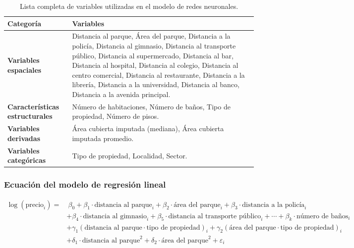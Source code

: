 \documentclass[a4paper]{article}
\theoremstyle{remark}
\theoremstyle{definition}
\begin{document}
\begin{table}[h!]
\centering
\begin{tabular}{l|p{12cm}}
\hline
\textbf{Categoría} & \textbf{Variables} \\ \hline
\textbf{Variables espaciales} & Distancia al parque, Área del parque, Distancia a la policía, Distancia al gimnasio, Distancia al transporte público, Distancia al supermercado, Distancia al bar, Distancia al hospital, Distancia al colegio, Distancia al centro comercial, Distancia al restaurante, Distancia a la librería, Distancia a la universidad, Distancia al banco, Distancia a la avenida principal. \\ \hline
\textbf{Características estructurales} & Número de habitaciones, Número de baños, Tipo de propiedad, Número de pisos. \\ \hline
\textbf{Variables derivadas} & Área cubierta imputada (mediana), Área cubierta imputada promedio. \\ \hline
\textbf{Variables categóricas} & Tipo de propiedad, Localidad, Sector. \\ \hline
\end{tabular}
\caption{Lista completa de variables utilizadas en el modelo de redes neuronales.}
\label{tab:variables_red_neuronal}
\end{table}


\subsubsection{Ecuación del modelo de regresión lineal}

\begin{align*}
\log(\text{precio}_i) = &\ \beta_0 
+ \beta_1 \cdot \text{distancia al parque}_i 
+ \beta_2 \cdot \text{área del parque}_i 
+ \beta_3 \cdot \text{distancia a la policía}_i \\
& + \beta_4 \cdot \text{distancia al gimnasio}_i + \beta_5 \cdot \text{distancia al transporte público}_i 
+ \cdots 
+ \beta_k \cdot \text{número de baños}_i \\
& + \gamma_1 (\text{distancia al parque} \cdot \text{tipo de propiedad})_i 
+ \gamma_2 (\text{área del parque} \cdot \text{tipo de propiedad})_i \\
& + \delta_1 \cdot \text{distancia al parque}^2 
+ \delta_2 \cdot \text{área del parque}^2 
+ \varepsilon_i
\end{align*}
\end{document}
